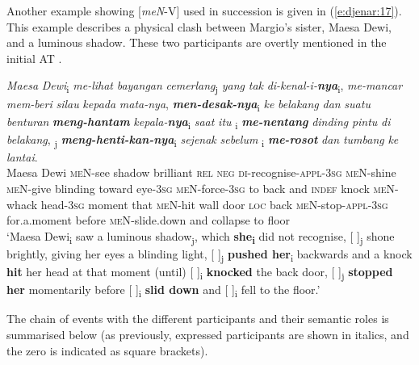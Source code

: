 \documentclass[output=paper
,modfonts
,nonflat]{langsci/langscibook}
\begin{document}
Another example showing [\textit{meN}-V] used in succession is given in (\ref{e:djenar:17}). This example describes a physical clash between Margio’s sister, Maesa Dewi, and a luminous shadow. These two participants are overtly mentioned in the initial AT . 

\begin{exe}
	\ex\label{e:djenar:17}
	\gll \textit{Maesa} \textit{Dewi}\textsubscript{i} \textit{me-lihat} \textit{bayangan} \textit{cemerlang}\textsubscript{j} \textit{yang} \textit{tak} \textit{di-kenal-i-}\textbf{\textit{nya}}\textsubscript{i}, \textit{me-mancar} \textit{mem-beri} \textit{silau} \textit{kepada} \textit{mata-nya}, \textbf{\textit{men-desak-nya}}\textsubscript{i} \textit{ke} \textit{belakang} \textit{dan} \textit{suatu} \textit{benturan} \textbf{\textit{meng-hantam}} \textit{kepala-}\textbf{\textit{nya}}\textsubscript{i} \textit{saat} \textit{itu} {\ob \cb}\textsubscript{i}   \textbf{\textit{me-nentang}} \textit{dinding} \textit{pintu} \textit{di} \textit{belakang}, {\ob \cb}\textsubscript{j}   \textbf{\textit{meng-henti-kan-nya}}\textsubscript{i} \textit{sejenak} \textit{sebelum} {\ob \cb}\textsubscript{i} \textbf{\textit{me-rosot}} \textit{dan} \textit{tumbang} \textit{ke} \textit{lantai}.\\
	Maesa Dewi \textsc{meN}{}-see shadow brilliant \textsc{rel} \textsc{neg} \textsc{di}-recognise-\textsc{appl}-\textsc{3sg}  \textsc{meN}-shine \textsc{meN}-give blinding toward eye-\textsc{3sg} \textsc{meN}-force-\textsc{3sg} to back and \textsc{indef} knock    \textsc{meN}-whack head-\textsc{3sg} moment that {} \textsc{meN}-hit wall door \textsc{loc} back {} \textsc{meN}-stop-\textsc{appl}-\textsc{3sg} for.a.moment before {} \textsc{meN}-slide.down and collapse to floor\\
	\glt ‘Maesa Dewi\textsubscript{i} saw a luminous shadow\textsubscript{j}, which \textbf{she\textsubscript{i}} did not recognise, [ ]\textsubscript{j} shone brightly, giving her eyes a blinding light, [ ]\textsubscript{j} \textbf{pushed her}\textsubscript{i} backwards and a knock \textbf{hit} her head at that moment (until) [ ]\textsubscript{i} \textbf{knocked} the back door, [ ]\textsubscript{j} \textbf{stopped} \textbf{her} momentarily before [ ]\textsubscript{i} \textbf{slid down} and [ ]\textsubscript{i} fell to the floor.’ \hfill \citep[34]{Kurniawan2004}
\end{exe}

\noindent
The chain of events with the different participants and their semantic roles is summarised below (as previously, expressed participants are shown in italics, and the zero is indicated as square brackets).
\end{document}

